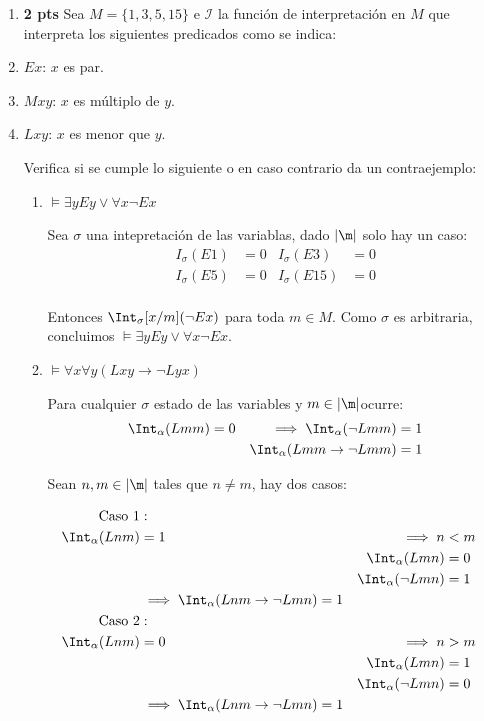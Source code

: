 \documentclass[11pt,letterpaper]{article}
\begin{document}
\begin{enumerate}
  \bigskip
\item {\bf 2 pts} Sea $M=\{1,3,5,15\}$ e $\mathcal{I}$ la función de interpretación en $M$ que interpreta los siguientes predicados como se indica:
  \bi 
\item $Ex$: $x$ es par.
\item $Mxy$: $x$ es múltiplo de $y$.
\item $Lxy$: $x$ es menor que $y$.
  \ei

  Verifica si se cumple lo siguiente o en caso contrario da un contraejemplo:

  \begin{enumerate}
  \item $\models\exists y Ey\lor\forall x\lnot Ex$

    Sea $\sigma$ una intepretación de las variablas, dado $|\m|$ solo hay
    un caso:
    \begin{align*}
      I_\sigma(E1) &= 0 & I_\sigma(E3) &= 0 \\
      I_\sigma(E5) &= 0 & I_\sigma(E15) &= 0 \\
    \end{align*}

    Entonces $\Int_\sigma[x/m](\neg Ex)$ para toda $m\in M$. Como $\sigma$ es
    arbitraria, concluimos $\models\exists y Ey\lor\forall x\lnot Ex$.

  \item $\models\forall x\forall y(Lxy\to\lnot Lyx)$

    Para cualquier $\sigma$ estado de las variables y $m\in|\m|$ocurre:
    \begin{align*}
      \Int_\alpha(Lmm) &= 0 &\implies \Int_\alpha(\neg Lmm) &= 1\\
      & & \Int_\alpha(Lmm\to\lnot Lmm) &= 1
    \end{align*}

    Sean $n,m\in|\m|$ tales que $n \neq m$, hay dos casos:
    
    \begin{align*}
      \text{Caso }1&:\\
      \Int_\alpha(Lnm) &= 1 & \implies n &< m\\
      & & \Int_\alpha(Lmn) &= 0\\
      & & \Int_\alpha(\neg Lmn) &= 1\\
      &\implies \Int_\alpha(Lnm \rightarrow \neg Lmn) = 1\\
      \text{Caso }2&:\\
      \Int_\alpha(Lnm) &= 0 & \implies n &> m\\
      & & \Int_\alpha(Lmn) &= 1\\
      & & \Int_\alpha(\neg Lmn) &= 0\\
      &\implies \Int_\alpha(Lnm \rightarrow \neg Lmn) = 1
    \end{align*}


\end{enumerate}
\end{enumerate}
\end{document}
